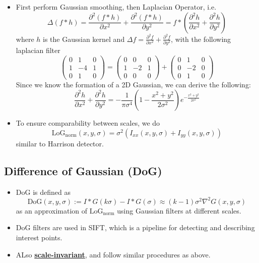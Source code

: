 \documentclass[twocolumn,landscape,10pt]{article}
\theoremstyle{definition}
\begin{document}
\begin{itemize}
    \item First perform Gaussian smoothing, then Laplacian Operator, i.e.
        \[
            \Delta(f*h)=\frac{\partial^2(f*h)}{\partial x^2}+
            \frac{\partial^2(f*h)}{\partial y^2}=f*
            \left(\frac{\partial^2h}{\partial x^2}+\frac{\partial^2h}{\partial
            y^2}\right)
        \]
        where $h$ is the Gaussian kernel and $\Delta
        f=\frac{\partial^2f}{\partial x^2}+\frac{\partial^2f}{\partial y^2}$,
        with the following laplacian filter
        \[
            \begin{pmatrix}
                0 & 1 & 0 \\
                1 & -4 & 1 \\
                0 & 1 & 0
            \end{pmatrix} 
            =
            \begin{pmatrix}
                0 & 0 & 0 \\
                1 & -2 & 1 \\
                0 & 0 & 0
            \end{pmatrix} 
            +
            \begin{pmatrix}
                0 & 1 & 0 \\
                0 & -2 & 0 \\
                0 & 1 & 0
            \end{pmatrix} 
        \]
        Since we know the formation of a 2D Gaussian, we can derive the
        following:
        \[
            \frac{\partial^2h}{\partial x^2}+\frac{\partial^2h}{\partial y^2}
            =-\frac{1}{\pi\sigma^4}\left(1-\frac{x^2+y^2}{2\sigma^2}\right)
            e^{-\frac{x^2+y^2}{2\sigma^2}}
        \]
    \item To ensure comparability between scales, we do
        \[
            \text{LoG}_\text{norm}(x,y,\sigma)=\sigma^2(I_{xx}(x,y,\sigma)+I_{yy}(x,y,\sigma))
        \]
        similar to Harrison detector.
\end{itemize} 

\subsection{Difference of Gaussian (DoG)}

\begin{itemize}
    \item DoG is defined as\[
            \text{DoG}(x,y,\sigma):=I*G(k\sigma)-I*G(\sigma)
            \approx (k-1)\sigma^2\nabla^2G(x,y,\sigma)
        \]
        as an approximation of $\text{LoG}_\text{norm}$ using Gaussian filters
        at different scales.
    \item DoG filters are used in SIFT, which is a pipeline for detecting and
        describing interest points.
    \item ALso \underline{\textbf{scale-invariant}}, and follow similar
        procedures as above.
\end{itemize} 
\end{document}
